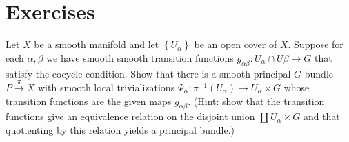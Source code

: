 \section{Exercises}

\begin{exc}
    \label{exc:bundleconst}
    Let $X$ be a smooth manifold and let $\left\{ U_\alpha \right\}$ be an open cover of $X$. Suppose for each
    $\alpha,\beta$ we have smooth smooth transition functions $g_{\alpha\beta}:U_\alpha\cap U\beta\to G$ that
    satisfy the cocycle condition. Show that there is a smooth principal $G$-bundle $P\xrightarrow{\pi} X$ with smooth local
    trivializations $\Psi_\alpha:\pi^{-1}(U_\alpha)\to U_\alpha\times G$ whose transition functions are the given maps
    $g_{\alpha\beta}$. (Hint: show that the transition functions give an equivalence relation on the disjoint union
    $\coprod U_\alpha\times G$ and that quotienting by this relation yields a principal bundle.)
\end{exc}


